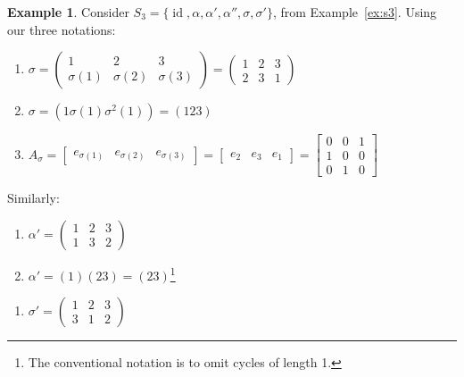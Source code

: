 \documentclass[12pt,letterpaper,DIV=11,final]{scrartcl}
\theoremstyle{plain}
\theoremstyle{definition}
\newtheorem{example}{Example}[section]
\theoremstyle{remark}
\DeclareMathOperator{\id}{id}
\begin{document}
\begin{example}\label{ex:s3perms}
  Consider $S_3 = \{ \id, \alpha, \alpha', \alpha'', \sigma, \sigma' \}$, from Example~\ref{ex:s3}.
  Using our three notations:

  \begin{enumerate}
    \item $\sigma =
      \begin{pmatrix}
        1         & 2         & 3 \\
        \sigma(1) & \sigma(2) & \sigma(3)
      \end{pmatrix} =
      \begin{pmatrix}
        1 & 2 & 3 \\
        2 & 3 & 1
      \end{pmatrix}$

    \item $\sigma = (1 \sigma(1) \sigma^2(1)) = (1 2 3)$

    \item $A_\sigma = \begin{bmatrix}
        e_{\sigma(1)} & e_{\sigma(2)} & e_{\sigma(3)}
      \end{bmatrix} =
      \begin{bmatrix}
        e_2 & e_3 & e_1
      \end{bmatrix} =
      \begin{bmatrix}
        0 & 0 & 1 \\
        1 & 0 & 0 \\
        0 & 1 & 0
      \end{bmatrix}$
  \end{enumerate}
  Similarly:
  \begin{multicols}{2}
    \begin{enumerate}
      \item $\alpha' = \begin{pmatrix}
          1 & 2 & 3 \\
          1 & 3 & 2
        \end{pmatrix}$

      \item $\alpha' = (1) (2 3) = (2 3)$\footnote{The conventional notation is to omit cycles of length 1.}
    \end{enumerate}

    \begin{enumerate}
      \item $\sigma' = \begin{pmatrix}
          1 & 2 & 3 \\
          3 & 1 & 2
        \end{pmatrix}$


\end{enumerate}
\end{multicols}
\end{example}
\end{document}
